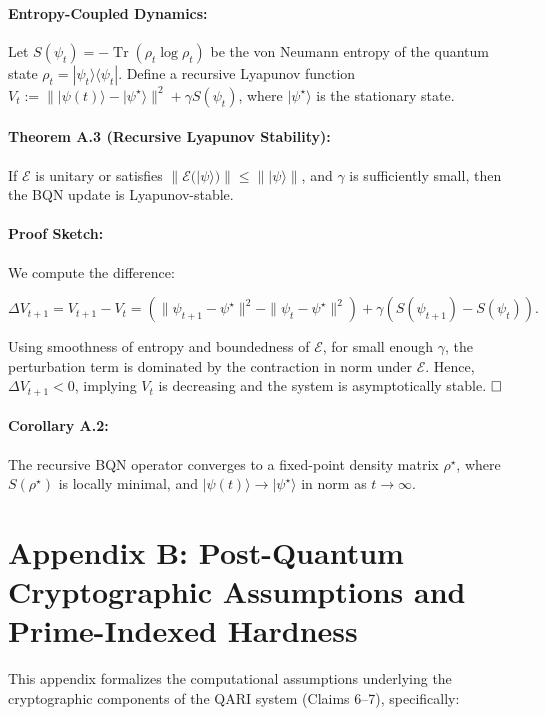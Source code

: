 \documentclass[12pt]{article}
\begin{document}
\begin{itemize}
\paragraph{Entropy-Coupled Dynamics:}
Let \(S(\psi_t) = -\operatorname{Tr}(\rho_t \log \rho_t)\) be the von Neumann entropy of the quantum state \(\rho_t = |\psi_t\rangle \langle \psi_t|\). Define a recursive Lyapunov function \(V_t := \| |\psi(t)\rangle - |\psi^\star\rangle \|^2 + \gamma S(\psi_t)\), where \(|\psi^\star\rangle\) is the stationary state.

\paragraph{Theorem A.3 (Recursive Lyapunov Stability):}
If \(\mathcal{E}\) is unitary or satisfies \(\|\mathcal{E}(|\psi\rangle)\| \leq \| |\psi\rangle \|\), and \(\gamma\) is sufficiently small, then the BQN update is Lyapunov-stable.

\paragraph{Proof Sketch:}
We compute the difference:

\[
\Delta V_{t+1} = V_{t+1} - V_t = \left(\| \psi_{t+1} - \psi^\star \|^2 - \| \psi_t - \psi^\star \|^2 \right) + \gamma (S(\psi_{t+1}) - S(\psi_t)).
\]

Using smoothness of entropy and boundedness of \(\mathcal{E}\), for small enough \(\gamma\), the perturbation term is dominated by the contraction in norm under \(\mathcal{E}\). Hence, \(\Delta V_{t+1} < 0\), implying \(V_t\) is decreasing and the system is asymptotically stable. \(\hfill \square\)

\paragraph{Corollary A.2:}
The recursive BQN operator converges to a fixed-point density matrix \(\rho^\star\), where \(S(\rho^\star)\) is locally minimal, and \(|\psi(t)\rangle \to |\psi^\star\rangle\) in norm as \(t \to \infty\).

\section*{Appendix B: Post-Quantum Cryptographic Assumptions and Prime-Indexed Hardness}

This appendix formalizes the computational assumptions underlying the cryptographic components of the QARI system (Claims 6–7), specifically:


\end{itemize}
\end{document}
